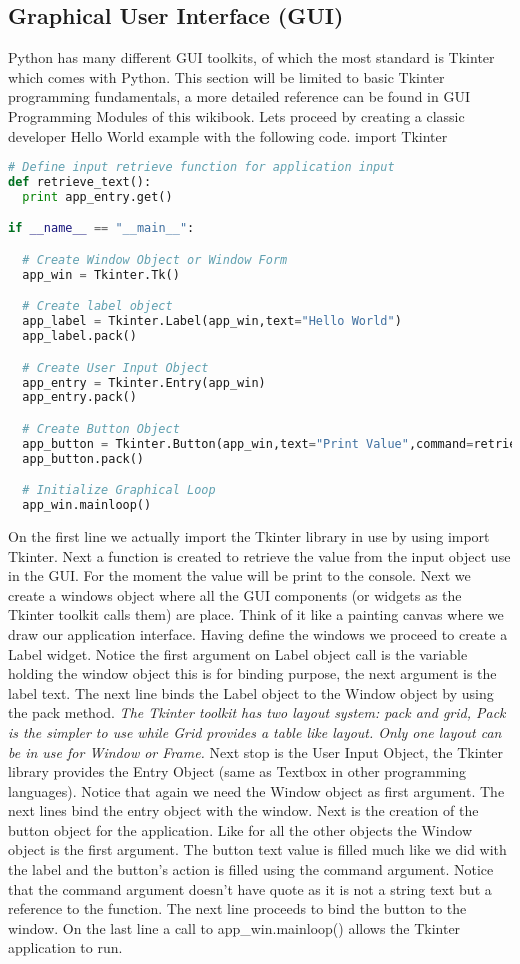 \subsection{Graphical User Interface (GUI)}
Python has many different GUI toolkits, of which the most standard is Tkinter
which comes with Python. This section will be limited to basic Tkinter
programming fundamentals, a more detailed reference can be found in GUI
Programming Modules of this wikibook.  Lets proceed by creating a classic
developer Hello World example with the following code.
import Tkinter
\lstset{basicstyle=\scriptsize, numbers=left, captionpos=b, tabsize=4}
\begin{lstlisting}[caption=Tkinter Example,language={Python},
xleftmargin=15pt, label=lst:tkinterexample]
# Define input retrieve function for application input
def retrieve_text():
  print app_entry.get()

if __name__ == "__main__":

  # Create Window Object or Window Form
  app_win = Tkinter.Tk()

  # Create label object
  app_label = Tkinter.Label(app_win,text="Hello World")
  app_label.pack()

  # Create User Input Object
  app_entry = Tkinter.Entry(app_win)
  app_entry.pack()

  # Create Button Object
  app_button = Tkinter.Button(app_win,text="Print Value",command=retrieve_text)
  app_button.pack()

  # Initialize Graphical Loop
  app_win.mainloop()
\end{lstlisting}
On the first line we actually import the Tkinter library in use by using import
Tkinter. Next a function is created to retrieve the value from the input object
use in the GUI. For the moment the value will be print to the console.  Next we
create a windows object where all the GUI components (or widgets as the Tkinter
toolkit calls them) are place. Think of it like a painting canvas where we draw
our application interface.  Having define the windows we proceed to create a
Label widget. Notice the first argument on Label object call is the variable
holding the window object this is for binding purpose, the next argument is the
label text. The next line binds the Label object to the Window object by using
the pack method.
\textit{The Tkinter toolkit has two layout system: pack and grid, Pack is the
simpler to use while Grid provides a table like layout. Only one layout can be
in use for Window or Frame.}
Next stop is the User Input Object, the Tkinter library provides the Entry
Object (same as Textbox in other programming languages). Notice that again we
need the Window object as first argument. The next lines bind the entry object
with the window.  Next is the creation of the button object for the application.
Like for all the other objects the Window object is the first argument. The
button text value is filled much like we did with the label and the button's
action is filled using the command argument. Notice that the command argument
doesn't have quote as it is not a string text but a reference to the function.
The next line proceeds to bind the button to the window.  On the last line a
call to app\_win.mainloop() allows the Tkinter application to run.

